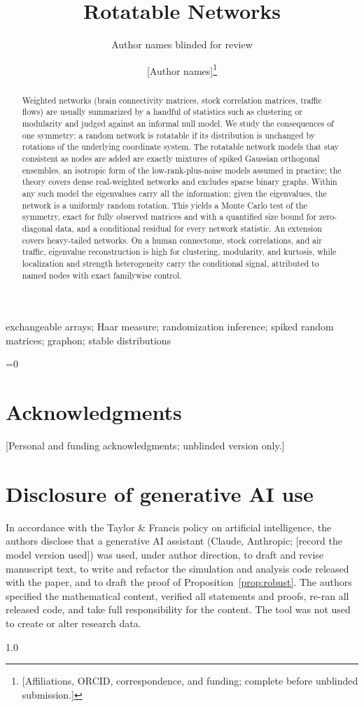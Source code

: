 \documentclass[12pt]{article}
\title{\bfseries Rotatable Networks}
\author{Author names blinded for review}
\author{[Author names]\thanks{[Affiliations, ORCID, correspondence,
and funding; complete before unblinded submission.]}}
\date{}
\newcommand{\blind}{1}
\theoremstyle{definition}
\theoremstyle{remark}
\begin{document}
\maketitle

\begin{abstract}
Weighted networks (brain connectivity matrices, stock correlation
matrices, traffic flows) are usually summarized by a handful of
statistics such as clustering or modularity and judged against an
informal null model. We study the consequences of one symmetry: a
random network is rotatable if its distribution is unchanged by
rotations of the underlying coordinate system. The rotatable network
models that stay consistent as nodes are added are exactly mixtures of
spiked Gaussian orthogonal ensembles, an isotropic form of the
low-rank-plus-noise models assumed in practice; the theory covers
dense real-weighted networks and excludes sparse binary graphs.
Within any such model the eigenvalues carry all the information: given
the eigenvalues, the network is a uniformly random rotation. This
yields a Monte Carlo test of the symmetry, exact for fully observed
matrices and with a quantified size bound for zero-diagonal data, and
a conditional residual for every network statistic. An extension
covers heavy-tailed networks. On a human connectome, stock
correlations, and air traffic, eigenvalue reconstruction is high for
clustering, modularity, and kurtosis, while localization and strength
heterogeneity carry the conditional signal, attributed to named nodes
with exact familywise control.
\end{abstract}

 exchangeable arrays; Haar measure;
randomization inference; spiked random matrices; graphon; stable
distributions

\newpage










\ifnum\blind=0
\section*{Acknowledgments}
[Personal and funding acknowledgments; unblinded version only.]

\section*{Disclosure of generative AI use}
In accordance with the Taylor \& Francis policy on artificial
intelligence, the authors disclose that a generative AI assistant
(Claude, Anthropic; [record the model version used]) was used, under
author direction, to draft and revise manuscript text, to write and
refactor the simulation and analysis code released with the paper, and
to draft the proof of Proposition~\ref{prop:robust}. The authors
specified the mathematical content, verified all statements and proofs,
re-ran all released code, and take full responsibility for the content.
The tool was not used to create or alter research data.
\fi

\begin{spacing}{1.0}\small\setlength{\bibsep}{2pt}


\end{spacing}
\end{document}
